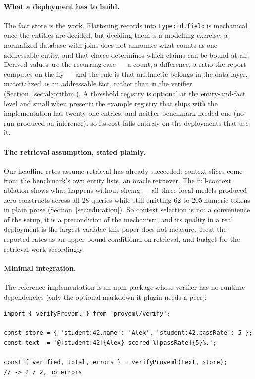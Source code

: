 \documentclass[11pt,a4paper]{article}
\begin{document}
\paragraph{What a deployment has to build.} The fact store is the work. Flattening records into \texttt{type:id.field} is mechanical once the entities are decided, but deciding them is a modelling exercise: a normalized database with joins does not announce what counts as one addressable entity, and that choice determines which claims can be bound at all. Derived values are the recurring case --- a count, a difference, a ratio the report computes on the fly --- and the rule is that arithmetic belongs in the data layer, materialized as an addressable fact, rather than in the verifier (Section~\ref{sec:algorithm}). A threshold registry is optional at the entity-and-fact level and small when present: the example registry that ships with the implementation has twenty-one entries, and neither benchmark needed one (no run produced an inference), so its cost falls entirely on the deployments that use it.

\paragraph{The retrieval assumption, stated plainly.} Our headline rates assume retrieval has already succeeded: context slices come from the benchmark's own entity lists, an oracle retriever. The full-context ablation shows what happens without slicing --- all three local models produced zero constructs across all 28 queries while still emitting 62 to 205 numeric tokens in plain prose (Section~\ref{sec:education}). So context selection is not a convenience of the setup, it is a precondition of the mechanism, and its quality in a real deployment is the largest variable this paper does not measure. Treat the reported rates as an upper bound conditional on retrieval, and budget for the retrieval work accordingly.

\paragraph{Minimal integration.} The reference implementation is an npm package whose verifier has no runtime dependencies (only the optional markdown-it plugin needs a peer):

\begin{lstlisting}
import { verifyProveml } from 'proveml/verify';

const store = { 'student:42.name': 'Alex', 'student:42.passRate': 5 };
const text  = '@[student:42]{Alex} scored %[passRate]{5}%.';

const { verified, total, errors } = verifyProveml(text, store);
// -> 2 / 2, no errors
\end{lstlisting}
\end{document}

